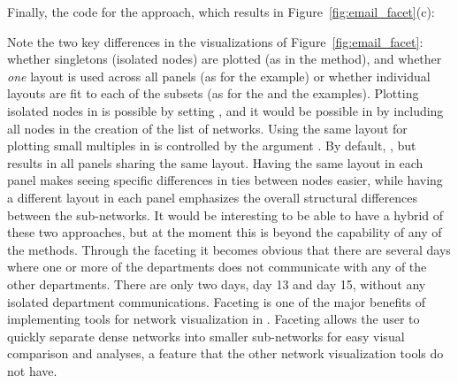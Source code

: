 \noindent
Finally, the code for the  approach, which results in Figure~\ref{fig:email_facet}(c):

Note the two key differences in the visualizations of Figure~\ref{fig:email_facet}: whether singletons (isolated nodes) are plotted (as in the  method), and whether \emph{one} layout is used across all panels (as for the  example) or whether individual layouts are fit to each of the subsets (as for the  and the  examples). Plotting isolated nodes in  is possible by setting , and it would be possible in  by including all nodes in the creation of the list of networks. Using the same layout for plotting small multiples in  is controlled by the argument . By default, , but  results in all panels sharing the same layout. Having the same layout in each panel makes seeing specific differences in ties between nodes easier, while having a different layout in each panel emphasizes the overall structural differences between the sub-networks. It would be interesting to be able to have a hybrid of these two approaches, but at the moment this is beyond the capability of any of the methods.
Through the faceting it becomes obvious that there are several days where one or more of the departments does not communicate with any of the other departments. There are only two days, day 13 and day 15, without any isolated department communications. Faceting is one of the major benefits of implementing tools for network visualization in . Faceting allows the user to quickly separate dense networks into smaller sub-networks for easy visual comparison and analyses, a feature that the other network visualization tools do not have.

